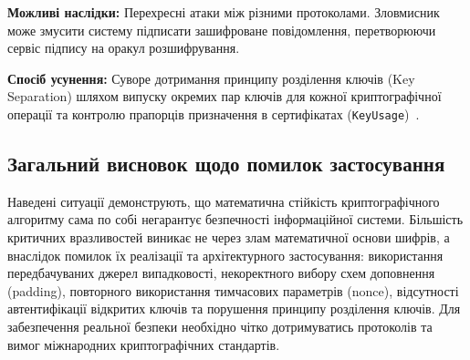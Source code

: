 \textbf{Можливі наслідки:} Перехресні атаки між різними протоколами. Зловмисник може змусити систему
підписати зашифроване повідомлення, перетворюючи сервіс підпису на оракул розшифрування.

\textbf{Спосіб усунення:} Суворе дотримання принципу розділення ключів (Key Separation) шляхом випуску
окремих пар ключів для кожної криптографічної операції та контролю прапорців призначення в сертифікатах
(\texttt{KeyUsage})~\cite{NIST80057}.

\subsection{Загальний висновок щодо помилок застосування}

Наведені ситуації демонструють, що математична стійкість криптографічного алгоритму сама по собі
негарантує безпечності інформаційної системи. Більшість критичних вразливостей виникає не через злам
математичної основи шифрів, а внаслідок помилок їх реалізації та архітектурного застосування: використання
передбачуваних джерел випадковості, некоректного вибору схем доповнення (padding), повторного
використання тимчасових параметрів (nonce), відсутності автентифікації відкритих ключів та порушення
принципу розділення ключів. Для забезпечення реальної безпеки необхідно чітко дотримуватись протоколів
та вимог міжнародних криптографічних стандартів.

